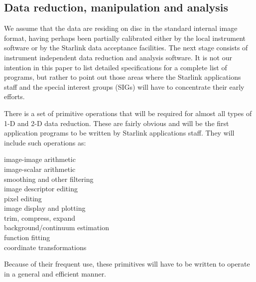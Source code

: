 \subsection {Data reduction, manipulation and analysis}
We assume that the data are residing on disc in the standard internal image
format, having perhaps been partially calibrated either by the local instrument
software or by the Starlink data acceptance facilities.
The next stage consists of instrument independent data reduction and analysis
software.
It is not our intention in this paper to list detailed specifications for a
complete list of programs, but rather to point out those areas where the
Starlink applications staff and the special interest groups (SIGs) will have to
concentrate their early efforts.

There is a set of primitive operations that will be required for almost all
types of 1-D and 2-D data reduction.
These are fairly obvious and will be the first application programs to be
written by Starlink applications staff.
They will include such operations as:
\begin{description}
\item [image-image arithmetic]
\item [image-scalar arithmetic]
\item [smoothing and other filtering]
\item [image descriptor editing]
\item [pixel editing]
\item [image display and plotting]
\item [trim, compress, expand]
\item [background/continuum estimation]
\item [function fitting]
\item [coordinate transformations]
\end{description}
Because of their frequent use, these primitives will have to be written to
operate in a general and efficient manner.


